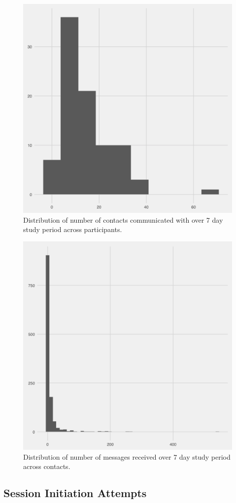 \documentclass[12pt]{nuthesis}	%
\begin{document}
\begin{figure}[h]
\centering
\includegraphics[width=.7\textwidth]{figures/all_messages_contacts_distribution}
\caption{Distribution of number of contacts communicated with over 7 day study period across participants.}
\label{fig:num_contacts}
\end{figure}

\begin{figure}[h]
\centering
\includegraphics[width=.7\textwidth]{figures/messages_received_by_contact_distribution}
\caption{Distribution of number of messages received over 7 day study period across contacts.}
\label{fig:received_messages_by_contact}
\end{figure}


\subsection{Session Initiation Attempts}
\end{document}
